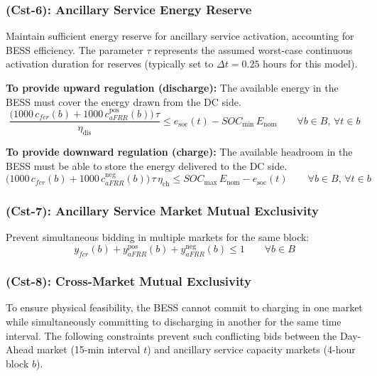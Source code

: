\documentclass[11pt, a4paper]{article}
\begin{document}
\subsubsection*{(Cst-6): Ancillary Service Energy Reserve}
Maintain sufficient energy reserve for ancillary service activation, accounting for BESS efficiency. The parameter $\tau$ represents the assumed worst-case continuous activation duration for reserves (typically set to $\Delta t = 0.25$ hours for this model).

\textbf{To provide upward regulation (discharge):} The available energy in the BESS must cover the energy drawn from the DC side.
\begin{equation}
    \frac{\big(1000\,c_{fcr}(b) + 1000\,c^{\mathrm{pos}}_{aFRR}(b)\big)\,\tau}{\eta_{\mathrm{dis}}} \leq e_{\mathrm{soc}}(t) - SOC_{\min}\,E_{\mathrm{nom}}  
    \qquad \forall b\in B,\, \forall t\in b
\end{equation}

\textbf{To provide downward regulation (charge):} The available headroom in the BESS must be able to store the energy delivered to the DC side.
\begin{equation}
    \big(1000\,c_{fcr}(b) + 1000\,c^{\mathrm{neg}}_{aFRR}(b)\big)\,\tau\,\eta_{\mathrm{ch}} \leq SOC_{\max}\,E_{\mathrm{nom}} - e_{\mathrm{soc}}(t)
    \qquad \forall b\in B,\, \forall t\in b
\end{equation}

\subsubsection*{(Cst-7): Ancillary Service Market Mutual Exclusivity}
Prevent simultaneous bidding in multiple markets for the same block:
\begin{equation}
    y_{fcr}(b) + y^{\mathrm{pos}}_{aFRR}(b) + y^{\mathrm{neg}}_{aFRR}(b) \le 1 \qquad \forall b\in B
\end{equation}

\subsubsection*{(Cst-8): Cross-Market Mutual Exclusivity}
To ensure physical feasibility, the BESS cannot commit to charging in one market while simultaneously committing to discharging in another for the same time interval. The following constraints prevent such conflicting bids between the Day-Ahead market (15-min interval $t$) and ancillary service capacity markets (4-hour block $b$).
\end{document}
